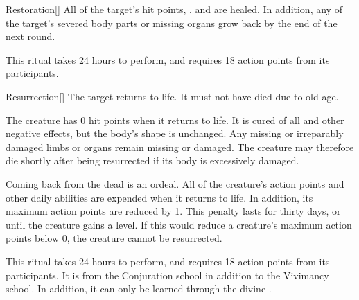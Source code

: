 \lowercase{\hypertarget{spell:Restoration}{}}\label{spell:Restoration}
\begin{apability}[\nth{3}]{\hypertarget{spell:Restoration}{Restoration}}[]
All of the target's hit points, , and  are healed.
In addition, any of the target's severed body parts or missing organs grow back by the end of the next round.

This ritual takes 24 hours to perform, and requires 18 action points from its participants.
\end{apability}
\vspace{0.25em}



\lowercase{\hypertarget{spell:Resurrection}{}}\label{spell:Resurrection}
\begin{apability}[\nth{3}]{\hypertarget{spell:Resurrection}{Resurrection}}[]
The target returns to life.
It must not have died due to old age.

The creature has 0 hit points when it returns to life.
It is cured of all  and other negative effects, but the body's shape is unchanged.
Any missing or irreparably damaged limbs or organs remain missing or damaged.
The creature may therefore die shortly after being resurrected if its body is excessively damaged.

Coming back from the dead is an ordeal.
All of the creature's action points and other daily abilities are expended when it returns to life.
In addition, its maximum action points are reduced by 1.
This penalty lasts for thirty days, or until the creature gains a level.
If this would reduce a creature's maximum action points below 0, the creature cannot be resurrected.

This ritual takes 24 hours to perform, and requires 18 action points from its participants.
It is from the Conjuration school in addition to the Vivimancy school.
In addition, it can only be learned through the divine .
\end{apability}
\vspace{0.25em}



